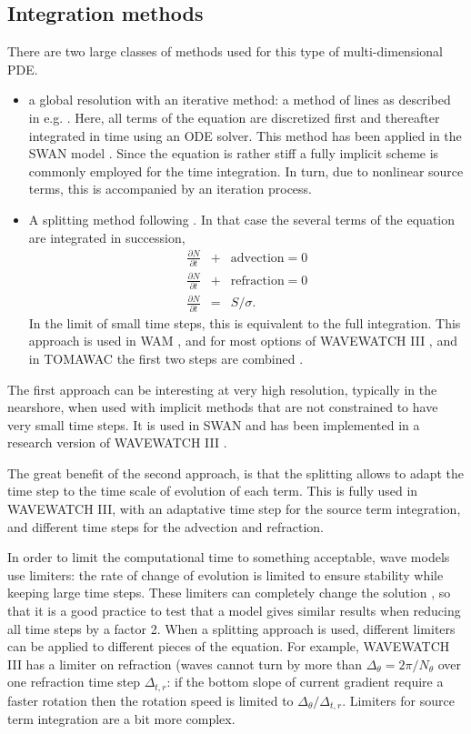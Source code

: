 \subsection{Integration methods}
There are two large classes of methods used for this type of multi-dimensional PDE. 

\begin{itemize}
\item a global resolution with an iterative method: a method of lines as described in e.g. \cite{Patankar1980}. Here, all terms of the equation are discretized first and thereafter integrated in time using an ODE solver. This method has been applied in the SWAN model \cite{Booij&al.1999}. Since the equation is rather stiff a fully implicit scheme is commonly employed for the time integration. In turn, due to nonlinear source terms, this is accompanied by an iteration process. 
\item  A splitting method following \cite{Yanenko1971}. In that case the several terms of the equation are integrated in succession, 
\begin{eqnarray}
 \frac{\partial N}{\partial t} &+& \mathrm{advection} = 0 \\
 \frac{\partial N}{\partial t} &+& \mathrm{refraction} = 0 \\
 \frac{\partial N}{\partial t}  &=& S/\sigma.
\end{eqnarray}
In the limit of small time steps, this is equivalent to the full integration. This approach is used in 
WAM \citep{WAMDI1988}, and for most options of WAVEWATCH III \citep{Tolman2002d}, and in TOMAWAC the first two steps are combined 
\citep{Benoit&al.1996}.
\end{itemize}

The first approach can be interesting at very high resolution, typically in the nearshore, when used with implicit methods that 
are not constrained to have very small time steps. It is used in SWAN \citep{Booij&al.1999} and has been implemented in a research version of WAVEWATCH III \citep{Huchet&al.2015}.  

The great benefit of the second approach, is that the splitting allows to adapt the time step to the time scale of evolution of 
each term. This is fully used in WAVEWATCH III, with an adaptative time step for the source term integration, and different time steps
for the advection and refraction. 

In order to limit the computational time to something acceptable, wave models use limiters: the rate of change of evolution 
is limited to ensure stability while keeping large time steps. These limiters can completely change the solution \citep{Tolman2002b,Roland&Ardhuin2014}, so that it 
is a good practice to test that a model gives similar results when reducing all time steps by a factor 2. When 
a splitting approach is used, different limiters  can be applied to different pieces of the equation. For example, WAVEWATCH III has a limiter on refraction (waves cannot 
turn by more than $\Delta_\theta=2\pi/N_\theta$ over one refraction time step $\Delta_{t,r}$: if the bottom slope of current gradient require a faster rotation then the 
rotation speed is limited to  $\Delta_\theta/\Delta_{t,r}$. Limiters for source term integration are a bit more complex.  

